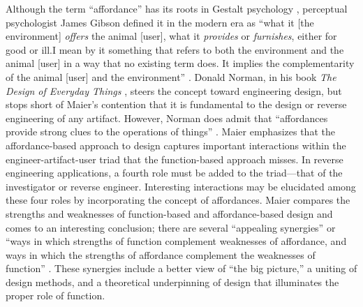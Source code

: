 Although the term “affordance” has its roots in Gestalt
psychology \citep{koffka1935}, perceptual psychologist James Gibson
defined it in the modern era as “what it [the environment]
\textit{offers} the animal [user], what it \textit{provides} or
\textit{furnishes}, either for good or ill.{\jdots}I mean by it something that
refers to both the environment and the animal [user] in a way that no
existing term does. It implies the complementarity of the animal [user]
and the environment” \citep[][p.~127]{gibson1979}. Donald Norman, in his book
\textit{The Design of Everyday Things} \citep{norman1988}, steers the
concept toward engineering design, but stops short of Maier’s
contention that it is fundamental to the design or reverse engineering
of any artifact. However, Norman does admit that ``affordances provide
strong clues to the operations of things'' \citep[][p.~9]{norman1988}. Maier emphasizes that the
affordance-based approach to design captures important interactions
within the engineer-artifact-user triad that the function-based
approach misses. In reverse engineering applications, a fourth role
must be added to the triad---that of the investigator or reverse
engineer. Interesting interactions may be elucidated among these four
roles by incorporating the concept of affordances. Maier compares the
strengths and weaknesses of function-based and affordance-based design
and comes to an interesting conclusion; there are several “appealing
synergies” or ``ways in which strengths of function complement
weaknesses of affordance, and ways in which the strengths of affordance
complement the weaknesses of function'' \citep{maierfadel2002}. These %
synergies include a better view of “the big picture,” a uniting of
design methods, and a theoretical underpinning of design that
illuminates the proper role of function.

